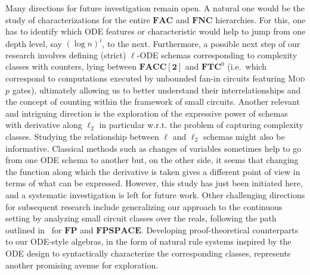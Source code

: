 \documentclass[11pt, oneside]{article}
\newcommand{\FP}{\mathbf{FP}}
\newcommand{\NC}{\mathbf{FNC}}
\newcommand{\AC}{\mathbf{FAC}}
\newcommand{\TC}{\mathbf{FTC}}
\theoremstyle{definition}
\begin{document}
Many directions for future investigation remain open.
%
A natural one would be the study of characterizations for the entire $\AC$ and $\NC$ hierarchies. For this, one has to identify which ODE features or characteristic would help to jump from one depth level, say $(\log n)^i$, to the next. 
%
Furthermore, a possible next step of our research involves defining (strict) $\ell$-ODE schemas corresponding to complexity classes with counters, lying between $\mathbf{FACC[2]}$ and $\TC^0$ (i.e.~which correspond to computations executed by unbounded fan-in circuits featuring \textsc{Mod $p$} gates), ultimately allowing us to better understand their interrelationships and the concept of counting within the framework of small circuits.
%
Another relevant and intriguing direction is the exploration of the expressive power of schemas with derivative along $\ell_2$ in particular w.r.t. the problem of capturing complexity classes. Studying the relationship between $\ell$ and $\ell_2$ schemas might also be informative. Classical methods such as changes of variables sometimes help to go from one ODE schema to another but, on the other side, it seems that changing the function along which the derivative is taken gives a different point of view in terms of what can be expressed.
%
%
However, this study has just been initiated here, and a systematic investigation is left for future work.
%
Other challenging directions for subsequent research include generalizing our approach to the continuous setting by analyzing small circuit classes over the reals, following the path outlined in~\cite{BlancBournez23} for $\FP$ and $\mathbf{FPSPACE}$.
%
Developing proof-theoretical counterparts to our ODE-style algebras, in the form of natural rule systems inspired by the ODE design to syntactically characterize the corresponding classes, represents another promising avenue for exploration. 
%
\end{document}

